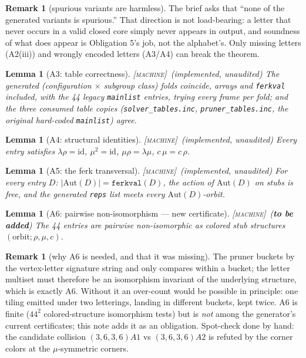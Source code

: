 \documentclass[11pt]{article}
\newtheorem{lemma}[theorem]{Lemma}
\theoremstyle{definition}
\newtheorem{remark}[theorem]{Remark}
\newcommand{\MACHINE}{\textnormal{\textsc{[machine]}}}
\newcommand{\Aut}{\mathrm{Aut}}
\begin{document}
\begin{remark}[spurious variants are harmless]
The brief asks that ``none of the generated variants is spurious.'' That direction is not
load-bearing: a letter that never occurs in a valid closed core simply never appears in
output, and soundness of what does appear is Obligation 5's job, not the alphabet's. Only
missing letters (A2(iii)) and wrongly encoded letters (A3/A4) can break the theorem.
\end{remark}

\begin{lemma}[A3: table correctness]\label{lem:A3} \MACHINE\ (implemented, unaudited)\;
The generated (configuration $\times$ subgroup class) folds coincide, arrays and
\texttt{ferkval} included, with the 44 legacy \texttt{mainlist} entries, trying every
frame per fold; and the three consumed table copies (\texttt{solver\_tables.inc},
\texttt{pruner\_tables.inc}, the original hard-coded \texttt{mainlist}) agree.
\end{lemma}

\begin{lemma}[A4: structural identities]\label{lem:A4} \MACHINE\ (implemented, unaudited)\;
Every entry satisfies $\lambda\rho = \mathrm{id}$, $\mu^2 = \mathrm{id}$,
$\mu\rho = \lambda\mu$, $c\,\mu = c\,\rho$.
\end{lemma}

\begin{lemma}[A5: the ferk transversal]\label{lem:A5} \MACHINE\ (implemented, unaudited)\;
For every entry $D$: $|\Aut(D)| = \texttt{ferkval}(D)$, the action of $\Aut(D)$ on stubs
is free, and the generated \texttt{reps} list meets every $\Aut(D)$-orbit.
\end{lemma}

\begin{lemma}[A6: pairwise non-isomorphism --- new certificate]\label{lem:A6}
\MACHINE\ (\textbf{to be added})\;
The 44 entries are pairwise non-isomorphic as colored stub structures
$(\text{orbit}; \rho, \mu, c)$.
\end{lemma}

\begin{remark}[why A6 is needed, and that it was missing]
The pruner buckets by the vertex-letter signature string and only compares within a
bucket; the letter multiset must therefore be an isomorphism invariant of the underlying
structure, which is exactly A6. Without it an over-count would be possible in principle:
one tiling emitted under two letterings, landing in different buckets, kept twice. A6 is
finite ($44^2$ colored-structure isomorphism tests) but is \emph{not} among the
generator's current certificates; this note adds it as an obligation. Spot-check done by
hand: the candidate collision $(3,6,3,6)A1$ vs $(3,6,3,6)A2$ is refuted by the corner
colors at the $\mu$-symmetric corners.
\end{remark}
\end{document}
